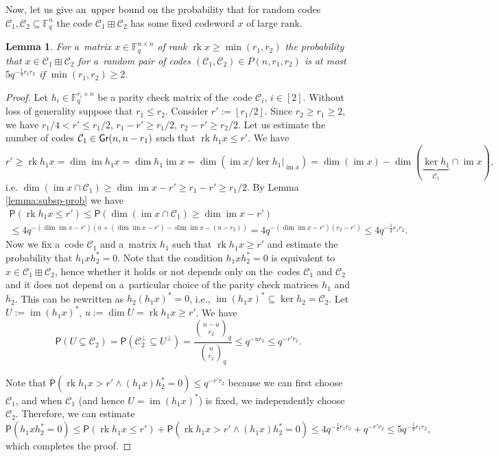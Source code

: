 \documentclass[11pt]{article}
\newcommand{\floorbr}[1]{\left\lfloor #1\right\rfloor}
\let\le\leqslant
\let\ge\geqslant
\theoremstyle{plain}
\newtheorem{lemma}{Lemma}
\theoremstyle{definition}
\theoremstyle{remark}
\newcommand{\cC}{\mathcal{C}}
\newcommand{\F}{\mathbb{F}}
\DeclareMathOperator{\rk}{rk}
\DeclareMathOperator{\im}{im}
\newcommand{\Gr}{{\sf Gr}}
\newcommand{\PP}{\mathsf{P}}
\begin{document}
Now, let us give an~upper bound on the probability that for random codes $\cC_1,\cC_2\subseteq\F_q^n$ the code $\cC_1\boxplus \cC_2$ has some fixed codeword $x$ of large rank.

\begin{lemma}\label{lemma:prodexp-highrank}
    For a~matrix $x\in\F_q^{n\times n}$ of rank $\rk x\ge \min(r_1,r_2)$ the probability that $x\in \cC_1\boxplus \cC_2$ for a~random pair of codes $(\cC_1,\cC_2)\in P(n,r_1,r_2)$ 
    is at most $5q^{-\frac14 r_1r_2}$ if $\min(r_1,r_2)\ge 2$.
\end{lemma}
\begin{proof}
    Let $h_i\in\F_q^{r_i\times n}$ be a parity check matrix of the~code $\cC_i$,  $i\in [2]$. Without loss of generality suppose that $r_1\le r_2$. %
    Consider $r':=\floorbr{r_1/2}$. Since $r_2\ge r_1\ge 2$, we have $r_1/4<r'\le r_1/2$, $r_1-r'\ge r_1/2$, $r_2-r'\ge r_2/2$. Let us estimate the number of codes $\cC_1\in\Gr(n, n-r_1)$ such that $\rk h_1x\le r'$.
    We have 
    \[r' \ge  \rk h_1x=\dim\im h_1x=\dim h_1\im x=\dim(\im x/\ker h_1|_{\im x})=\dim(\im x)-\dim(\underbrace{\ker h_1}_{\cC_1}\cap \im x), 
    \]
    i.e. $\dim (\im x\cap \cC_1)\ge \dim\im x-r'\ge r_1-r'\ge r_1/2$. By Lemma \ref{lemma:subsp-prob} we have
    \begin{multline*}
    \PP(\rk h_1x\le r')\le\PP(\dim (\im x\cap \cC_1)\ge \dim\im x-r')\\
    \le 4q^{-(\dim\im x-r')(n+(\dim\im x-r')-\dim\im x-(n-r_2))}=4q^{-(\dim\im x-r')(r_2-r')}\le 4q^{-\frac14 r_1r_2}. %
    \end{multline*}
    Now we fix a~code $\cC_1$ and a~matrix $h_1$ such that $\rk h_1x\ge r'$ and estimate the probability that $h_1x h_2^*=0$. Note that the condition $h_1xh_2^*=0$ is equivalent to $x\in \cC_1\boxplus \cC_2$, hence whether it holds or not depends only on the~codes $\cC_1$ and $\cC_2$ and it does not depend on a~particular choice of the parity check matrices $h_1$ and $h_2$.
    This can be rewritten as $h_2(h_1x)^*=0$, i.e., $\im (h_1x)^*\subseteq \ker h_2=\cC_2$. Let $U:=\im (h_1x)^*$, $u:=\dim U=\rk h_1x\ge r'$. We have
    \[\PP(U\subseteq \cC_2)=\PP(\cC_2^\bot\subseteq U^\bot)=\frac{\binom{n-u}{r_2}_q}{\binom{n}{r_2}_q}\le q^{-ur_2}\le q^{-r'r_2}.
    \]

    Note that $\PP(\rk h_1x > r'\wedge (h_1x)h_2^*=0)\le q^{-r'r_2}$ because we can first choose $\cC_1$, and when $\cC_1$ (and hence $U=\im (h_1x)^*$) is fixed, we independently choose $\cC_2$.
    Therefore, we can estimate
    \[
    \PP(h_1xh_2^*=0)\le \PP(\rk h_1x\le r')+\PP(\rk h_1x > r'\wedge (h_1x)h_2^*=0)\le 4q^{-\frac14 r_1r_2}+q^{-r'r_2}\le 5q^{-\frac14 r_1r_2}, 
    \]
    which completes the proof. \qedhere
\end{proof}
\end{document}
